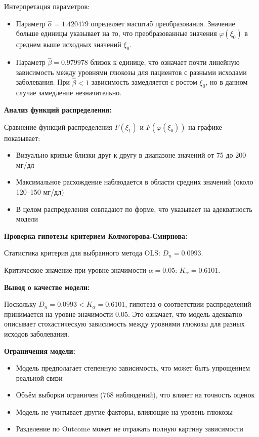 \documentclass[a4paper, 14pt]{extarticle}
\begin{document}
Интерпретация параметров:
\begin{itemize}
  \item Параметр $\hat{\alpha} = 1.420479$ определяет масштаб преобразования. Значение больше единицы указывает на то, что преобразованные значения $\varphi(\xi_0)$ в среднем выше исходных значений $\xi_0$.
  \item Параметр $\hat{\beta} = 0.979978$ близок к единице, что означает почти линейную зависимость между уровнями глюкозы для пациентов с разными исходами заболевания. При $\hat{\beta} < 1$ зависимость замедляется с ростом $\xi_0$, но в данном случае замедление незначительно.
\end{itemize}

\textbf{Анализ функций распределения:}

Сравнение функций распределения $F(\xi_1)$ и $F(\varphi(\xi_0))$ на графике показывает:
\begin{itemize}
  \item Визуально кривые близки друг к другу в диапазоне значений от 75 до 200 мг/дл
  \item Максимальное расхождение наблюдается в области средних значений (около 120--150 мг/дл)
  \item В целом распределения совпадают по форме, что указывает на адекватность модели
\end{itemize}

\textbf{Проверка гипотезы критерием Колмогорова-Смирнова:}

Статистика критерия для выбранного метода OLS: $D_n = 0.0993$.

Критическое значение при уровне значимости $\alpha = 0.05$: $K_{\alpha} = 0.6101$.

\textbf{Вывод о качестве модели:}

Поскольку $D_n = 0.0993 < K_{\alpha} = 0.6101$, гипотеза о соответствии распределений принимается на уровне значимости 0.05. Это означает, что модель адекватно описывает стохастическую зависимость между уровнями глюкозы для разных исходов заболевания.

\textbf{Ограничения модели:}

\begin{itemize}
  \item Модель предполагает степенную зависимость, что может быть упрощением реальной связи
  \item Объём выборки ограничен (768 наблюдений), что влияет на точность оценок
  \item Модель не учитывает другие факторы, влияющие на уровень глюкозы
  \item Разделение по Outcome может не отражать полную картину зависимости
\end{itemize}
\end{document}
